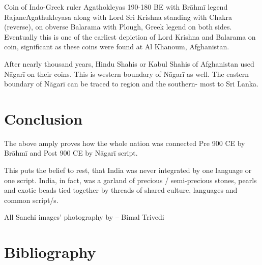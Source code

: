 Coin of Indo-Greek ruler Agathokleyas 190-180 BE with Brāhmī legend RajaneAgathukleyasa along with Lord Sri Krishna standing with Chakra (reverse), on obverse Balarama with Plough, Greek legend on both sides. Eventually this is one of the earliest depiction of Lord Krishna and Balarama on coin, significant as these coins were found at Al Khanoum, Afghanistan.

After nearly thousand years, Hindu Shahis or Kabul Shahis of Afghanistan used Nāgarī on their coins. This is western boundary of Nāgarī as well. The eastern boundary of Nāgarī can be traced to  region and the southern- most to Sri Lanka.


\section*{Conclusion}

The above amply proves how the whole nation was connected Pre 900 CE by Brāhmī and Post 900 CE by Nāgarī script.

This puts the belief to rest, that India was never integrated by one language or one script. India, in fact, was a garland of precious / semi-precious stones, pearls and exotic beads tied together by threads of shared culture, languages and common script/s.

All Sanchi images’ photography by – Bimal Trivedi

\newpage


\section*{Bibliography}

